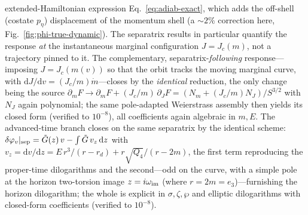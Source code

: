 \documentclass[12pt]{iopart}
\newcommand{\Jc}{J_{c}}
\newcommand{\dd}{\mathrm{d}}
\begin{document}
extended-Hamiltonian expression Eq.~\eqref{eq:adiab-exact}, which adds the
off-shell (costate $p_\eta$) displacement of the momentum shell (a $\sim2\%$
correction here, Fig.~\ref{fig:phi-true-dynamic}). The separatrix
results in particular quantify the response \emph{at} the instantaneous marginal
configuration $J=\Jc(m)$, not a trajectory pinned to it. The complementary,
separatrix-\emph{following} response---imposing $J=\Jc(m(v))$ so that the orbit
tracks the moving marginal curve, with $\dd J/\dd v=(\Jc/m)\dot m$---closes by the
\emph{identical} reduction, the only change being the source $\partial_m F\to
\partial_m F+(\Jc/m)\,\partial_J F=(N_m+(\Jc/m)N_J)/S^{3/2}$ with $N_J$ again
polynomial; the same pole-adapted Weierstrass assembly then yields its closed form
(verified to $10^{-8}$), all coefficients again algebraic in $m,E$. The
advanced-time branch closes on the same separatrix by the identical scheme:
$\delta\varphi_v|_{\rm sep}=\tilde G(z)\,v-\int\tilde G\,v_z\,\dd z$ with
$v_z=\dd v/\dd z=E\,r^3/(r-r_d)+r\sqrt{Q_4}/(r-2m)$, the first term reproducing the
proper-time dilogarithms and the second---odd on the curve, with a simple pole at
the horizon two-torsion image $z=i\omega_{\rm im}$ (where $r=2m=e_3$)---furnishing the
horizon dilogarithm; the whole is explicit in $\sigma,\zeta,\wp$ and elliptic
dilogarithms with closed-form coefficients (verified to $10^{-8}$).


\end{document}
